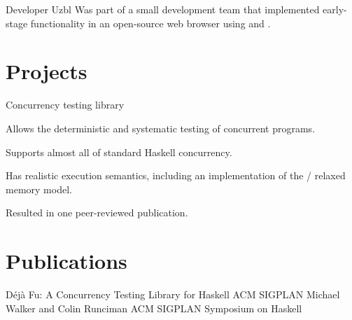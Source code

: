 \documentclass[a4paper]{cv}
\begin{document}
  {Developer}
  {Uzbl}
  {}
  {Was part of a small development team that implemented early-stage
    functionality in an open-source web browser using  and
    .}

\section{Projects}

  {}
  {Concurrency testing library}
  {\begin{tightitemize}
    \item Allows the deterministic and systematic testing of
      concurrent  programs.
    \item Supports almost all of standard Haskell concurrency.
    \item Has realistic execution semantics, including an
      implementation of the  / 
      relaxed memory model.
    \item Resulted in one peer-reviewed publication.
    \end{tightitemize}}

\section{Publications}

  {Déjà Fu: A Concurrency Testing Library for Haskell}
  {ACM SIGPLAN}
  {Michael Walker and Colin Runciman}
  {ACM SIGPLAN Symposium on Haskell}
\end{document}
